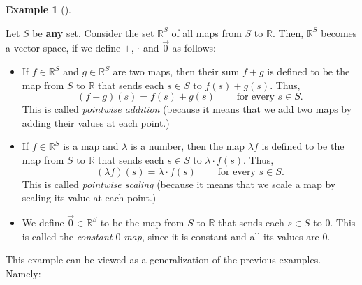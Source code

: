 \documentclass[numbers=enddot,12pt,final,onecolumn,notitlepage]{scrartcl}%
\theoremstyle{definition}
\newtheorem{exam}[theo]{Example}
\newenvironment{example}[1][]
{\begin{exam}[#1]\begin{leftbar}}
{\end{leftbar}\end{exam}}
\begin{document}
\begin{example}
\label{exam.vectspace.RS}Let $S$ be \textbf{any} set. Consider the set
$\mathbb{R}^{S}$ of all maps from $S$ to $\mathbb{R}$. Then, $\mathbb{R}^{S}$
becomes a vector space, if we define $+$, $\cdot$ and $\overrightarrow{0}$ as follows:

\begin{itemize}
\item If $f\in\mathbb{R}^{S}$ and $g\in\mathbb{R}^{S}$ are two maps, then
their sum $f+g$ is defined to be the map from $S$ to $\mathbb{R}$ that sends
each $s\in S$ to $f\left(  s\right)  +g\left(  s\right)  $. Thus,%
\[
\left(  f+g\right)  \left(  s\right)  =f\left(  s\right)  +g\left(  s\right)
\ \ \ \ \ \ \ \ \ \ \text{for every }s\in S.
\]
This is called \textit{pointwise addition} (because it means that we add two
maps by adding their values at each point.)

\item If $f\in\mathbb{R}^{S}$ is a map and $\lambda$ is a number, then the map
$\lambda f$ is defined to be the map from $S$ to $\mathbb{R}$ that sends each
$s\in S$ to $\lambda\cdot f\left(  s\right)  $. Thus,%
\[
\left(  \lambda f\right)  \left(  s\right)  =\lambda\cdot f\left(  s\right)
\ \ \ \ \ \ \ \ \ \ \text{for every }s\in S.
\]
This is called \textit{pointwise scaling} (because it means that we scale a
map by scaling its value at each point.)

\item We define $\overrightarrow{0}\in\mathbb{R}^{S}$ to be the map from $S$
to $\mathbb{R}$ that sends each $s\in S$ to $0$. This is called the
\textit{constant-}$0$\textit{ map}, since it is constant and all its values
are $0$.
\end{itemize}

This example can be viewed as a generalization of the previous examples. Namely:


\end{example}
\end{document}
